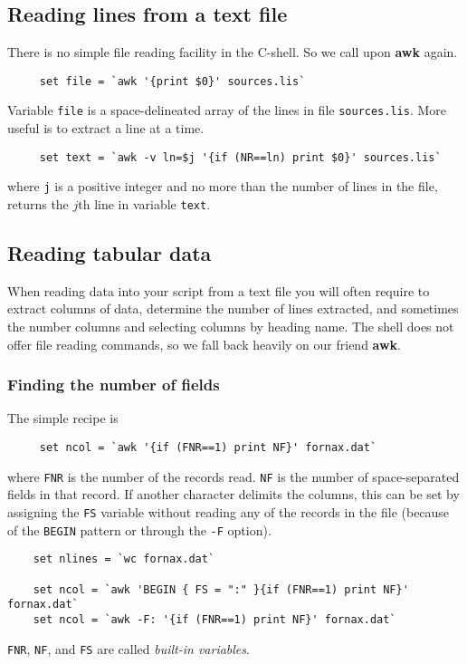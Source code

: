 \subsection{Reading lines from a text file\label{sc4_se_read_lines}}

There is no simple file reading facility in the C-shell.  So we call
upon {\bf awk} again.

\small
\begin{verbatim}
     set file = `awk '{print $0}' sources.lis`
\end{verbatim}
\normalsize
Variable {\tt file} is a space-delineated array of the lines in file
{\tt sources.lis}.  More useful is to extract a line at a time.

\small
\begin{verbatim}
     set text = `awk -v ln=$j '{if (NR==ln) print $0}' sources.lis`
\end{verbatim}
\normalsize
where  {\tt j} is a positive
integer and no more than the number of lines in the file, returns the $j$th 
line in variable {\tt text}.

\newpage
\subsection{Reading tabular
data\label{sc4_se_read_table}}

When reading data into your script from a text file you will often
require to extract columns of data, determine the number of lines
extracted, and sometimes the number columns and selecting columns by
heading name.  The shell does not offer file reading commands, so we
fall back heavily on our friend {\bf awk}.

\subsubsection{Finding the number of fields\label{sc4_se_find_nf}}

The simple recipe is
\small
\begin{verbatim}
     set ncol = `awk '{if (FNR==1) print NF}' fornax.dat`
\end{verbatim}
\normalsize
where {\tt FNR} is the number of the records read.  {\tt NF} is the number of
space-separated fields in that record.  If another character delimits
the columns, this can be set by assigning the {\tt FS} variable without
reading any of the records in the file (because of the {\tt BEGIN}
pattern or through the {\tt -F} option).
\small
\begin{verbatim}
    set nlines = `wc fornax.dat`
     
    set ncol = `awk 'BEGIN { FS = ":" }{if (FNR==1) print NF}' fornax.dat`
    set ncol = `awk -F: '{if (FNR==1) print NF}' fornax.dat`
\end{verbatim}
\normalsize
{\tt FNR}, {\tt NF}, and {\tt FS} are called {\em built-in variables}.

